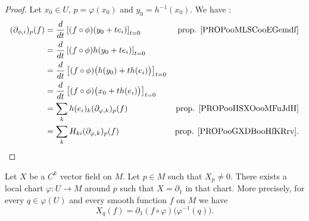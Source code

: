 \begin{proof}
	Let \( x_0\in U\), \( p=\varphi(x_0)\) and \( y_0=h^{-1}(x_0)\). We have :
	\begin{subequations}
		\begin{align}
			(\partial_{\phi,i})_p(f) & =\frac{d}{dt} \left[ (f\circ\phi)(y_0+te_i)  \right]_{t=0}                 & \text{prop. \ref{PROPooMLSCooEGemdf}}  \\
			                         & =\frac{d}{dt} \left[ (f\circ\phi)h(y_0+te_i)  \right]_{t=0}                                                         \\
			                         & =\frac{d}{dt} \left[ (f\circ\phi)\big( h(y_0)+th(e_i) \big)  \right]_{t=0}                                          \\
			                         & =\frac{d}{dt} \left[ (f\circ\phi)\big( x_0+th(e_i) \big)  \right]_{t=0}                                             \\
			                         & =\sum_kh(e_i)_k(\partial_{\varphi,k})_p(f)                                 & \text{prop. \ref{PROPooHSXOooMFuJdH}}  \\
			                         & =\sum_kH_{ki}(\partial_{\varphi,k})_p(f)                                   & \text{prop. \ref{PROPooGXDBooHfKRrv}}.
		\end{align}
	\end{subequations}
\end{proof}



\begin{lemma}       \label{LEMooLNIAooCmbLQp}
	Let \( X\) be a \( C^k\) vector field on \( M\). Let \( p\in M\) such that \( X_p\neq 0\). There exists a local chart \( \varphi\colon U\to M\) around \( p\) such that \( X=\partial_1\) in that chart. More precisely, for every \( q\in \varphi(U)\) and every smooth function \( f\) on \( M\) we have
	\begin{equation}
		X_q(f)=\partial_1(f\circ \varphi)\big( \varphi^{-1}(q) \big).
	\end{equation}
\end{lemma}

